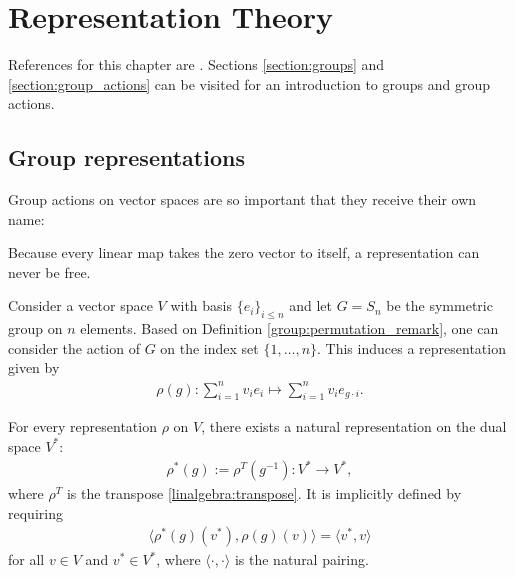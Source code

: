 \chapter{Representation Theory}

    References for this chapter are \cite{fultonharris, jeevanjee}. Sections \ref{section:groups} and \ref{section:group_actions} can be visited for an introduction to groups and group actions.

\section{Group representations}

    Group actions on vector spaces are so important that they receive their own name:
    \begin{property}
        Because every linear map takes the zero vector to itself, a representation can never be free.
    \end{property}


    \begin{example}\label{rep:permutation}
        Consider a vector space $V$ with basis $\{e_i\}_{i\leq n}$ and let $G=S_n$ be the symmetric group on $n$ elements. Based on Definition \ref{group:permutation_remark}, one can consider the action of $G$ on the index set $\{1,\ldots,n\}$. This induces a representation given by
        \begin{gather}
            \rho(g):\sum_{i=1}^nv_ie_i\mapsto\sum_{i=1}^nv_ie_{g\cdot i}.
        \end{gather}
    \end{example}

    \begin{example}
        For every representation $\rho$ on $V$, there exists a natural representation on the dual space $V^*$:
        \begin{gather}
            \rho^*(g) := \rho^T(g^{-1}):V^*\rightarrow V^*,
        \end{gather}
        where $\rho^T$ is the transpose \ref{linalgebra:transpose}. It is implicitly defined by requiring
        \begin{gather}
            \Big\langle\rho^*(g)(v^*),\rho(g)(v)\Big\rangle = \langle v^*,v \rangle
        \end{gather}
        for all $v\in V$ and $v^*\in V^*$, where $\langle\cdot,\cdot\rangle$ is the natural pairing.
    \end{example}


